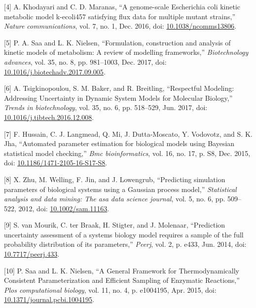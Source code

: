 \documentclass[11pt]{article}
\begin{document}
\hypertarget{citeproc_bib_item_4}{[4] A. Khodayari and C. D. Maranas, “A genome-scale Escherichia coli kinetic metabolic model k-ecoli457 satisfying flux data for multiple mutant strains,” \textit{Nature communications}, vol. 7, no. 1, Dec. 2016, doi: \href{https://doi.org/10.1038/ncomms13806}{10.1038/ncomms13806}.}

\hypertarget{citeproc_bib_item_5}{[5] P. A. Saa and L. K. Nielsen, “Formulation, construction and analysis of kinetic models of metabolism: A review of modelling frameworks,” \textit{Biotechnology advances}, vol. 35, no. 8, pp. 981–1003, Dec. 2017, doi: \href{https://doi.org/10.1016/j.biotechadv.2017.09.005}{10.1016/j.biotechadv.2017.09.005}.}

\hypertarget{citeproc_bib_item_6}{[6] A. Tsigkinopoulou, S. M. Baker, and R. Breitling, “Respectful Modeling: Addressing Uncertainty in Dynamic System Models for Molecular Biology,” \textit{Trends in biotechnology}, vol. 35, no. 6, pp. 518–529, Jun. 2017, doi: \href{https://doi.org/10.1016/j.tibtech.2016.12.008}{10.1016/j.tibtech.2016.12.008}.}

\hypertarget{citeproc_bib_item_7}{[7] F. Hussain, C. J. Langmead, Q. Mi, J. Dutta-Moscato, Y. Vodovotz, and S. K. Jha, “Automated parameter estimation for biological models using Bayesian statistical model checking,” \textit{Bmc bioinformatics}, vol. 16, no. 17, p. S8, Dec. 2015, doi: \href{https://doi.org/10.1186/1471-2105-16-S17-S8}{10.1186/1471-2105-16-S17-S8}.}

\hypertarget{citeproc_bib_item_8}{[8] X. Zhu, M. Welling, F. Jin, and J. Lowengrub, “Predicting simulation parameters of biological systems using a Gaussian process model,” \textit{Statistical analysis and data mining: The asa data science journal}, vol. 5, no. 6, pp. 509–522, 2012, doi: \href{https://doi.org/10.1002/sam.11163}{10.1002/sam.11163}.}

\hypertarget{citeproc_bib_item_9}{[9] S. van Mourik, C. ter Braak, H. Stigter, and J. Molenaar, “Prediction uncertainty assessment of a systems biology model requires a sample of the full probability distribution of its parameters,” \textit{Peerj}, vol. 2, p. e433, Jun. 2014, doi: \href{https://doi.org/10.7717/peerj.433}{10.7717/peerj.433}.}

\hypertarget{citeproc_bib_item_10}{[10] P. Saa and L. K. Nielsen, “A General Framework for Thermodynamically Consistent Parameterization and Efficient Sampling of Enzymatic Reactions,” \textit{Plos computational biology}, vol. 11, no. 4, p. e1004195, Apr. 2015, doi: \href{https://doi.org/10.1371/journal.pcbi.1004195}{10.1371/journal.pcbi.1004195}.}
\end{document}
